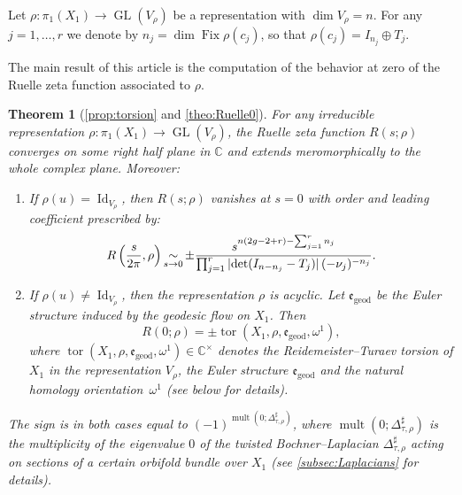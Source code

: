 \documentclass[JEP,XML,SOM,Unicode,NoFloatCountersInSection,published]{cedram}
\newcommand{\simm}{\mathop{\sim}\displaylimits}
\theoremstyle{plain}
\newtheorem{thmalph}{Theorem}
\theoremstyle{definition}
\theoremstyle{remark}
\newcommand{\C}{\mathbb{C}}
\newcommand{\geod}{\mathrm{geod}}
\DeclareMathOperator{\GL}{GL}
\DeclareMathOperator{\Id}{Id}
\DeclareMathOperator{\Fix}{Fix}
\numberwithin{equation}{section}
\DeclareMathOperator{\tor}{tor}
\DeclareMathOperator{\mult}{mult}
\begin{document}
Let $\rho \colon \pi_1(X_1) \to \GL(V_\rho)$ be a representation with $\dim V_\rho=n$. For any $j=1, \ldots, r$ we denote by $n_j= \dim \Fix \rho(c_j)$, so that $\rho(c_j) = I_{n_j} \oplus T_j$.

The main result of this article is the computation of the behavior at zero of the Ruelle zeta function associated to $\rho$.

\begin{thmalph}[\cref{prop:torsion} and \cref{theo:Ruelle0}]\label{theo:mainFried}
For any irreducible representation $\rho\colon \pi_1(X_1) \to \GL(V_\rho)$, the Ruelle zeta function $R(s;\rho)$ converges on some right half plane in $\C$ and extends meromorphically to the whole complex plane. Moreover:
\begin{enumerate}
\item \label{i1}
If $\rho(u)= \Id_{V_\rho}$, then $R(s;\rho)$ vanishes at $s=0$ with order and leading coefficient prescribed by:
\[
R\left(\frac{s}{2\pi}, \rho\right) \simm_{s \to 0} \pm \frac{s^{n(2g-2+r)-\sum_{j=1}^rn_j}}{\prod_{j=1}^r |{\det}(I_{n-n_j} -T_j)|\,(-\nu_j)^{-n_j}}.
\]

\item \label{i2}
If $\rho(u) \neq\Id_{V_\rho}$, then the representation $\rho$ is acyclic. Let $\mathfrak e_{\geod}$ be the Euler structure induced by the geodesic flow on $X_1$. Then
\[
R(0;\rho) = \pm\tor(X_1,\rho,\mathfrak {e}_{\geod}, \omega^1),
\]
where $\tor(X_1,\rho, \mathfrak e_{\geod}, \omega^1)\in\C^\times$ denotes the Reidemeister--Turaev torsion of $X_1$ in the representation $V_\rho$, the Euler structure $\mathfrak e_{\geod}$ and the natural homology orientation~$\omega^1$ (see below for details).
\end{enumerate}

The sign is in both cases equal to $(-1)^{\mult(0;\Delta_{\tau,\rho}^\sharp)}$, where $\mult(0;\Delta_{\tau,\rho}^\sharp)$ is the multiplicity of the eigenvalue $0$ of the twisted Bochner--Laplacian $\Delta_{\tau,\rho}^\sharp$ acting on sections of a certain orbifold bundle over $X_1$ (see \cref{subsec:Laplacians} for details).
\end{thmalph}
\end{document}
